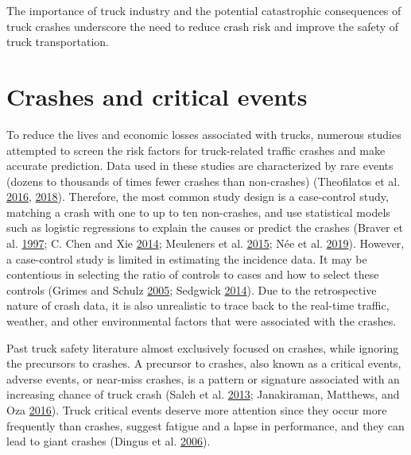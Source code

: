 \documentclass[12pt]{book}
\numberwithin{equation}{chapter}
\begin{document}
The importance of truck industry and the potential catastrophic consequences of truck crashes underscore the need to reduce crash risk and improve the safety of truck transportation.

\hypertarget{crashes-and-critical-events}{%
\section{Crashes and critical events}\label{crashes-and-critical-events}}

To reduce the lives and economic losses associated with trucks, numerous studies attempted to screen the risk factors for truck-related traffic crashes and make accurate prediction. Data used in these studies are characterized by rare events (dozens to thousands of times fewer crashes than non-crashes) (Theofilatos et al. \protect\hyperlink{ref-theofilatos2016predicting}{2016}, \protect\hyperlink{ref-theofilatos2018impact}{2018}). Therefore, the most common study design is a case-control study, matching a crash with one to up to ten non-crashes, and use statistical models such as logistic regressions to explain the causes or predict the crashes (Braver et al. \protect\hyperlink{ref-braver1997tractor}{1997}; C. Chen and Xie \protect\hyperlink{ref-chen2014modeling}{2014}; Meuleners et al. \protect\hyperlink{ref-meuleners2015obstructive}{2015}; Née et al. \protect\hyperlink{ref-nee2019road}{2019}). However, a case-control study is limited in estimating the incidence data. It may be contentious in selecting the ratio of controls to cases and how to select these controls (Grimes and Schulz \protect\hyperlink{ref-grimes2005compared}{2005}; Sedgwick \protect\hyperlink{ref-sedgwick2014case}{2014}). Due to the retrospective nature of crash data, it is also unrealistic to trace back to the real-time traffic, weather, and other environmental factors that were associated with the crashes.

Past truck safety literature almost exclusively focused on crashes, while ignoring the precursors to crashes. A precursor to crashes, also known as a critical events, adverse events, or near-miss crashes, is a pattern or signature associated with an increasing chance of truck crash (Saleh et al. \protect\hyperlink{ref-saleh2013accident}{2013}; Janakiraman, Matthews, and Oza \protect\hyperlink{ref-janakiraman2016discovery}{2016}). Truck critical events deserve more attention since they occur more frequently than crashes, suggest fatigue and a lapse in performance, and they can lead to giant crashes (Dingus et al. \protect\hyperlink{ref-dingus2006development}{2006}).
\end{document}
